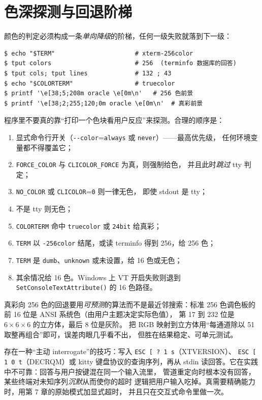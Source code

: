 \documentclass[12pt,a4paper,fontset=fandol]{ctexbook}
\newcommand{\Fn}[1]{\texttt{#1()}}
\newcommand{\Tp}[1]{\texttt{#1}}
\newcommand{\Opt}[1]{\texttt{-\/-#1}}
\newcommand{\Bk}{\allowbreak}
\begin{document}
\section{色深探测与回退阶梯}

颜色的判定必须构成一条\emph{单向降级}的阶梯，任何一级失败就落到下一级：

\begin{lstlisting}[style=shellstyle,caption={用外部工具观察终端自报的能力}]
$ echo "$TERM"                      # xterm-256color
$ tput colors                       # 256  (terminfo 数据库的回答)
$ tput cols; tput lines             # 132 ; 43
$ echo "$COLORTERM"                 # truecolor
$ printf '\e[38;5;208m oracle \e[0m\n'   # 256 色前景
$ printf '\e[38;2;255;120;0m oracle \e[0m\n'  # 真彩前景
\end{lstlisting}

程序里不要真的靠``打印一个色块看用户反应''来探测。合理的顺序是：

\begin{enumerate}
\item 显式命令行开关（\Opt{color}=\Tp{always} 或 \Tp{never}）——最高优先级，
      任何环境变量都不得覆盖它；
\item \Tp{FORCE\_COLOR} 与 \Tp{CLICOLOR\_FORCE} 为真，则强制给色，
      并且此时\emph{跳过} tty 判定；
\item \Tp{NO\_COLOR} 或 \Tp{CLICOLOR}=\Tp{0} 则一律无色，
      即使 stdout 是 tty；
\item 不是 tty 则无色；
\item \Tp{COLORTERM} 命中 \Tp{truecolor} 或 \Tp{24bit} 给真彩；
\item \Tp{TERM} 以 \Tp{-256color} 结尾，或读 terminfo 得到 256，给 256 色；
\item \Tp{TERM} 是 \Tp{dumb}、\Tp{unknown} 或未设置，给 16 色或无色；
\item 其余情况给 16 色。Windows 上 VT 开启失败则退到
      \Fn{Set\Bk Console\Bk TextAttribute} 的 16 色路径。
\end{enumerate}

真彩向 256 色的回退要用\emph{可预测}的算法而不是最近邻搜索：标准 256
色调色板的前 16 位是 ANSI 系统色（由用户主题决定实际色值），
第 17 到 232 位是 \(6\times6\times6\) 的立方体，最后 8 位是灰阶。
把 RGB 映射到立方体用``每通道除以 51 取整再组合''即可，误差肉眼几乎看不出，
但胜在结果稳定、可单元测试。

\begin{warning}[title={不要向终端发查询指令}]
存在一种``主动 interrogate''的技巧：写入 \Tp{ESC [ ? 1 s}（XTVERSION）、
\Tp{ESC [ 1 0 t}（DECRQM）或 kitty 键盘协议的查询序列，再从 stdin
读回答。它在实践中不可靠：回答与用户按键混在同一个输入流里，
管道重定向时根本没有回答，某些终端对未知序列\emph{沉默}从而使你的超时
逻辑把用户输入吃掉。真需要精确能力时，用第 7 章的原始模式加显式超时，
并且只在交互式命令里做一次。
\end{warning}
\end{document}
